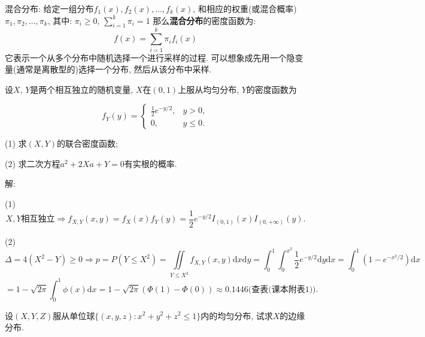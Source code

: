 \documentclass[standard]{ExBook}
\begin{document}
\begin{qitems}
\begin{bbox}
\textcolor{themeColor}{\selectfont {} 混合分布: 给定一组分布\( f_1(x), f_2(x), \dots, f_k(x) \), 和相应的权重(或混合概率)\( \pi_1, \pi_2, \dots, \pi_k \), 其中:
\( \pi_i \geq 0 \), 
\( \sum_{i=1}^k \pi_i = 1 \)
那么\textbf{混合分布}的密度函数为: 
\[
f(x) = \sum_{i=1}^k \pi_i f_i(x)
\]
它表示一个从多个分布中随机选择一个进行采样的过程. 可以想象成先用一个隐变量(通常是离散型的)选择一个分布, 然后从该分布中采样.
}
    \end{bbox}

\vspace{-5em}

    \begin{bbox}
    \begin{shaded}
        \qitem
设$X$, $Y$是两个相互独立的随机变量, $X$在$(0,1)$上服从均匀分布, $Y$的密度函数为
\vspace{-2em}
\begin{center}
\begin{equation}
    f_{Y}(y)=
    \left\{
    \begin{array}{cl}
        \nonumber
        \displaystyle\frac{1}{2}e^{-y/2}, & y>0,\\
        0, & y\leq 0.
    \end{array}
    \right.
\end{equation}
\end{center}
(1) 求$(X, Y)$的联合密度函数;

(2) 求二次方程$a^2+2Xa+Y=0$有实根的概率.
    \end{shaded}
    \end{bbox}

\vspace{-5em}

    \begin{bbox}
解: 

(1)
$$X,Y\text{相互独立} \Longrightarrow f_{X,Y}(x,y)=f_{X}(x)f_{Y}(y)=\displaystyle\frac{1}{2}e^{-y/2}I_{(0,1)}(x)I_{(0,+\infty)}(y).$$

(2)
$$\Delta=4(X^2-Y)\geq 0 \Longrightarrow p=P(Y\leq X^2)=\displaystyle\iint\limits_{Y\leq X^2}f_{X,Y}(x,y)\mathrm{d}x\mathrm{d}y=\int_{0}^{1}\int_{0}^{x^2}\frac{1}{2}e^{-y/2}\mathrm{d}y\mathrm{d}x=\int_{0}^{1}(1-e^{-x^2/2})\mathrm{d}x$$
$$=1-\sqrt{2\pi}\int_{0}^{1}\phi(x)\mathrm{d}x=1-\sqrt{2\pi}(\Phi(1)-\Phi(0))\approx0.1446\text{(查表(课本附表1))}.$$
    \end{bbox}

\vspace{-5em}

    \begin{bbox}
    \begin{shaded}
        \qitem
设$(X,Y,Z)$服从单位球$\{(x,y,z):x^2+y^2+z^2\leq 1\}$内的均匀分布, 试求$X$的边缘分布.
    \end{shaded}
    \end{bbox}


\end{qitems}
\end{document}
